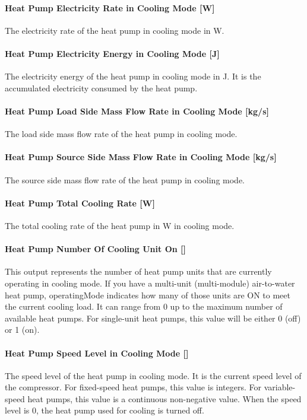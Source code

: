 \paragraph{Heat Pump Electricity Rate in Cooling Mode {[}W{]}} The electricity
rate of the heat pump in cooling mode in W.
\paragraph{Heat Pump Electricity Energy in Cooling Mode {[}J{]}} The electricity
energy of the heat pump in cooling mode in J. It is the accumulated electricity
consumed by the heat pump.
\paragraph{Heat Pump Load Side Mass Flow Rate in Cooling Mode {[}kg/s{]}} The
load side mass flow rate of the heat pump in cooling mode.
\paragraph{Heat Pump Source Side Mass Flow Rate in Cooling Mode {[}kg/s{]}} The
source side mass flow rate of the heat pump in cooling mode.
\paragraph{Heat Pump Total Cooling Rate {[}W{]}} The total cooling rate of the
heat pump in W in cooling mode.
\paragraph{Heat Pump Number Of Cooling Unit On {[}{]}}
This output represents the number of heat pump units that are currently operating
in cooling mode. If you have a multi-unit (multi-module) air-to-water heat pump,
operatingMode indicates how many of those units are ON to meet the current cooling load.
It can range from 0 up to the maximum number of available heat pumps. For single-unit heat pumps,
this value will be either 0 (off) or 1 (on).
\paragraph{Heat Pump Speed Level in Cooling Mode {[}{]}} The speed level of the
heat pump in cooling mode. It is the current speed level of the compressor. For
fixed-speed heat pumps, this value is integers. For variable-speed heat pumps,
this value is a continuous non-negative value. When the speed level is 0,
the heat pump used for cooling is turned off.
